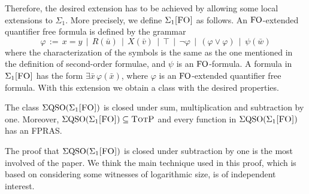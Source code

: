 Therefore, the desired extension has to be achieved by allowing some local extensions to $\Sigma_1$. More precisely, we define $\Sigma_{1}\textsc{[FO]}$ as follows. An ${\rm FO}$-extended quantifier free formula is defined by the grammar
\[
\varphi \,:=\, x = y \,\mid\, R(\bar{u}) \,\mid\, X(\bar{v}) \,\mid\, \top \,\mid\, \neg\varphi \,\mid\, (\varphi\vee\varphi) \,\mid\, \psi(\bar{w})
\]
where the characterization of the symbols is the same as the one mentioned in the definition of second-order formulae, and $\psi$ is an ${\rm FO}$-formula. A formula in $\Sigma_{1}\textsc{[FO]}$ has the form $\exists\bar{x}\,\varphi(\bar{x})$, where $\varphi$ is an ${\rm FO}$-extended quantifier free formula. 
With this extension we obtain a class with the desired properties.
\begin{theorem}\label{sigmafo-minusone}
The class $\Sigma{\rm QSO}(\Sigma_{1}\textsc{[FO]})$ is closed under sum, multiplication and subtraction by one. Moreover, $\Sigma{\rm QSO}(\Sigma_{1}\textsc{[FO]}) \subseteq \text{\sc TotP}$ and every function in $\Sigma{\rm QSO}(\Sigma_{1}\textsc{[FO]})$ has an FPRAS.
\end{theorem}
The proof that $\Sigma{\rm QSO}(\Sigma_{1}\textsc{[FO]})$ is closed under subtraction by one is the most involved of the paper. We think the main technique used in this proof, which is based on considering some witnesses of logarithmic size, is of independent interest. 


%


